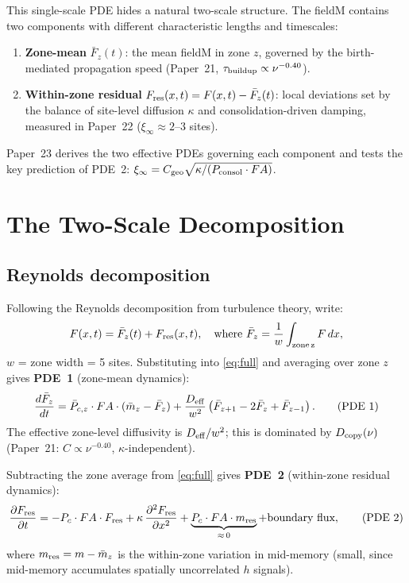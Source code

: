 \documentclass[11pt]{article}
\begin{document}
This single-scale PDE hides a natural two-scale structure.
The fieldM contains two components with different characteristic lengths and timescales:
\begin{enumerate}
  \item \textbf{Zone-mean} $\bar{F}_z(t)$: the mean fieldM in zone $z$, governed by
    the birth-mediated propagation speed (Paper~21, $\tau_{\rm buildup} \propto \nu^{-0.40}$).
  \item \textbf{Within-zone residual} $F_{\rm res}(x,t) = F(x,t) - \bar{F}_z(t)$:
    local deviations set by the balance of site-level diffusion $\kappa$ and
    consolidation-driven damping, measured in Paper~22 ($\xi_\infty \approx 2$--$3$ sites).
\end{enumerate}
Paper~23 derives the two effective PDEs governing each component and tests
the key prediction of PDE~2: $\xi_\infty = C_{\rm geo}\sqrt{\kappa/(P_{\rm consol}\cdot FA)}$.

\section{The Two-Scale Decomposition}

\subsection{Reynolds decomposition}

Following the Reynolds decomposition from turbulence theory, write:
\begin{equation}
  F(x,t) = \bar{F}_z(t) + F_{\rm res}(x,t), \quad
  \text{where } \bar{F}_z = \frac{1}{w}\int_{\rm zone\,z} F\,dx,
\end{equation}
$w$ = zone width = 5 sites.
Substituting into \eqref{eq:full} and averaging over zone $z$ gives
\textbf{PDE~1} (zone-mean dynamics):
\begin{equation}
  \frac{d\bar{F}_z}{dt}
  = \bar{P}_{c,z}\cdot FA\cdot(\bar{m}_z - \bar{F}_z)
    + \frac{D_{\rm eff}}{w^2}\left(\bar{F}_{z+1} - 2\bar{F}_z + \bar{F}_{z-1}\right).
  \tag{PDE~1}
\end{equation}
The effective zone-level diffusivity is $D_{\rm eff}/w^2$; this is dominated
by $D_{\rm copy}(\nu)$ (Paper~21: $C \propto \nu^{-0.40}$, $\kappa$-independent).

Subtracting the zone average from \eqref{eq:full} gives
\textbf{PDE~2} (within-zone residual dynamics):
\begin{equation}
  \frac{\partial F_{\rm res}}{\partial t}
  = -P_c\cdot FA\cdot F_{\rm res}
    + \kappa\,\frac{\partial^2 F_{\rm res}}{\partial x^2}
    + \underbrace{P_c\cdot FA\cdot m_{\rm res}}_{\approx\,0}
    + \text{boundary flux},
  \tag{PDE~2}
\end{equation}
where $m_{\rm res} = m - \bar{m}_z$ is the within-zone variation in mid-memory
(small, since mid-memory accumulates spatially uncorrelated $h$ signals).
\end{document}
